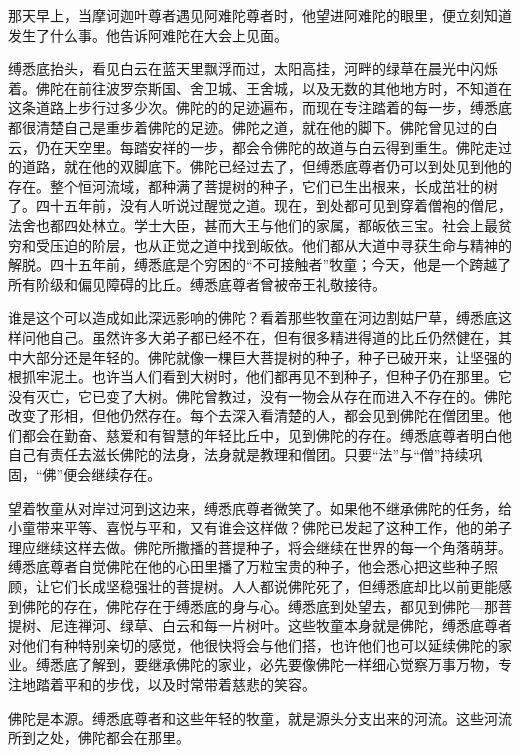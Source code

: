 \documentclass[12pt,twoside,openany]{book}
\begin{document}
那天早上，当摩诃迦叶尊者遇见阿难陀尊者时，他望进阿难陀的眼里，便立刻知道发生了什么事。他告诉阿难陀在大会上见面。

缚悉底抬头，看见白云在蓝天里飘浮而过，太阳高挂，河畔的绿草在晨光中闪烁着。佛陀在前往波罗奈斯国、舍卫城、王舍城，以及无数的其他地方时，不知道在这条道路上步行过多少次。佛陀的的足迹遍布，而现在专注踏着的每一步，缚悉底都很清楚自己是重步着佛陀的足迹。佛陀之道，就在他的脚下。佛陀曾见过的白云，仍在天空里。每踏安祥的一步，都会令佛陀的故道与白云得到重生。佛陀走过的道路，就在他的双脚底下。佛陀已经过去了，但缚悉底尊者仍可以到处见到他的存在。整个恒河流域，都种满了菩提树的种子，它们已生出根来，长成茁壮的树了。四十五年前，没有人听说过醒觉之道。现在，到处都可见到穿着僧袍的僧尼，法舍也都四处林立。学士大臣，甚而大王与他们的家属，都皈依三宝。社会上最贫穷和受压迫的阶层，也从正觉之道中找到皈依。他们都从大道中寻获生命与精神的解脱。四十五年前，缚悉底是个穷困的“不可接触者”牧童；今天，他是一个跨越了所有阶级和偏见障碍的比丘。缚悉底尊者曾被帝王礼敬接待。

谁是这个可以造成如此深远影响的佛陀？看着那些牧童在河边割姑尸草，缚悉底这样问他自己。虽然许多大弟子都已经不在，但有很多精进得道的比丘仍然健在，其中大部分还是年轻的。佛陀就像一棵巨大菩提树的种子，种子已破开来，让坚强的根抓牢泥土。也许当人们看到大树时，他们都再见不到种子，但种子仍在那里。它没有灭亡，它已变了大树。佛陀曾教过，没有一物会从存在而进入不存在的。佛陀改变了形相，但他仍然存在。每个去深入看清楚的人，都会见到佛陀在僧团里。他们都会在勤奋、慈爱和有智慧的年轻比丘中，见到佛陀的存在。缚悉底尊者明白他自己有责任去滋长佛陀的法身，法身就是教理和僧团。只要“法”与“僧”持续巩固，“佛”便会继续存在。

望着牧童从对岸过河到这边来，缚悉㡳尊者微笑了。如果他不继承佛陀的任务，给小童带来平等、喜悦与平和，又有谁会这样做？佛陀已发起了这种工作，他的弟子理应继续这样去做。佛陀所撒播的菩提种子，将会继续在世界的每一个角落萌芽。缚悉底尊者自觉佛陀在他的心田里播了万粒宝贵的种子，他会悉心把这些种子照顾，让它们长成坚稳强壮的菩提树。人人都说佛陀死了，但缚悉底却比以前更能感到佛陀的存在，佛陀存在于缚悉底的身与心。缚悉底到处望去，都见到佛陀---那菩提树、尼连禅河、绿草、白云和每一片树叶。这些牧童本身就是佛陀，缚悉底尊者对他们有种特别亲切的感觉，他很快将会与他们搭，也许他们也可以延续佛陀的家业。缚悉底了解到，要继承佛陀的家业，必先要像佛陀一样细心觉察万事万物，专注地踏着平和的步伐，以及时常带着慈悲的笑容。

佛陀是本源。缚悉底尊者和这些年轻的牧童，就是源头分支出来的河流。这些河流所到之处，佛陀都会在那里。

\end{document}
